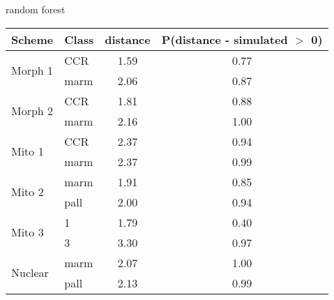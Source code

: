 \begin{subtable}[b]{0.3\textwidth}
  \caption{random forest}
  \centering
  \begin{tabular}{ l | l c c }
    \hline
    Scheme & Class & distance & P(distance - simulated \(>\) 0)\\ 
    \hline
    \hline
    \multirow{2}{*}{Morph 1} & CCR & 1.59 & 0.77 \\ 
    & marm & 2.06 & 0.87 \\ 
    \hline
    \multirow{2}{*}{Morph 2} & CCR & 1.81 & 0.88 \\ 
    & marm & 2.16 & 1.00 \\ 
    \hline
    \multirow{2}{*}{Mito 1} & CCR & 2.37 & 0.94 \\ 
    & marm & 2.37 & 0.99 \\ 
    \hline
    \multirow{2}{*}{Mito 2} & marm & 1.91 & 0.85 \\ 
    & pall & 2.00 & 0.94 \\ 
    \hline
    \multirow{2}{*}{Mito 3} & 1 & 1.79 & 0.40 \\ 
    & 3 & 3.30 & 0.97 \\ 
    \hline
    \multirow{2}{*}{Nuclear} & marm & 2.07 & 1.00 \\ 
    & pall & 2.13 & 0.99 \\ 
    \hline
  \end{tabular}
  \label{rfmiss}
\end{subtable}
